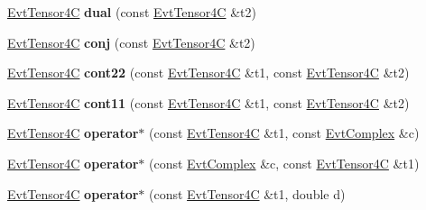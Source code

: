 \begin{DoxyCompactItemize}
\item 
\hypertarget{class_evt_tensor4_c_a0ed1091103eafd34a2d08bc601f19fa6}{}\hyperlink{class_evt_tensor4_c}{Evt\+Tensor4\+C} {\bfseries dual} (const \hyperlink{class_evt_tensor4_c}{Evt\+Tensor4\+C} \&t2)\label{class_evt_tensor4_c_a0ed1091103eafd34a2d08bc601f19fa6}

\item 
\hypertarget{class_evt_tensor4_c_ae68de4cff87a75dd364331f4d1bad996}{}\hyperlink{class_evt_tensor4_c}{Evt\+Tensor4\+C} {\bfseries conj} (const \hyperlink{class_evt_tensor4_c}{Evt\+Tensor4\+C} \&t2)\label{class_evt_tensor4_c_ae68de4cff87a75dd364331f4d1bad996}

\item 
\hypertarget{class_evt_tensor4_c_a9c105e3b96a10c903b0348f0f80f918c}{}\hyperlink{class_evt_tensor4_c}{Evt\+Tensor4\+C} {\bfseries cont22} (const \hyperlink{class_evt_tensor4_c}{Evt\+Tensor4\+C} \&t1, const \hyperlink{class_evt_tensor4_c}{Evt\+Tensor4\+C} \&t2)\label{class_evt_tensor4_c_a9c105e3b96a10c903b0348f0f80f918c}

\item 
\hypertarget{class_evt_tensor4_c_aadb591373f3b6732f1e03f1d5e665154}{}\hyperlink{class_evt_tensor4_c}{Evt\+Tensor4\+C} {\bfseries cont11} (const \hyperlink{class_evt_tensor4_c}{Evt\+Tensor4\+C} \&t1, const \hyperlink{class_evt_tensor4_c}{Evt\+Tensor4\+C} \&t2)\label{class_evt_tensor4_c_aadb591373f3b6732f1e03f1d5e665154}

\item 
\hypertarget{class_evt_tensor4_c_ade87ac9f9c4e36fb025499e7aa0be17e}{}\hyperlink{class_evt_tensor4_c}{Evt\+Tensor4\+C} {\bfseries operator$\ast$} (const \hyperlink{class_evt_tensor4_c}{Evt\+Tensor4\+C} \&t1, const \hyperlink{class_evt_complex}{Evt\+Complex} \&c)\label{class_evt_tensor4_c_ade87ac9f9c4e36fb025499e7aa0be17e}

\item 
\hypertarget{class_evt_tensor4_c_a52783c55f82e6e549f2dbc05b6427b58}{}\hyperlink{class_evt_tensor4_c}{Evt\+Tensor4\+C} {\bfseries operator$\ast$} (const \hyperlink{class_evt_complex}{Evt\+Complex} \&c, const \hyperlink{class_evt_tensor4_c}{Evt\+Tensor4\+C} \&t1)\label{class_evt_tensor4_c_a52783c55f82e6e549f2dbc05b6427b58}

\item 
\hypertarget{class_evt_tensor4_c_a5fba0e1837126cde291909a5e6e30bb3}{}\hyperlink{class_evt_tensor4_c}{Evt\+Tensor4\+C} {\bfseries operator$\ast$} (const \hyperlink{class_evt_tensor4_c}{Evt\+Tensor4\+C} \&t1, double d)\label{class_evt_tensor4_c_a5fba0e1837126cde291909a5e6e30bb3}


\end{DoxyCompactItemize}
